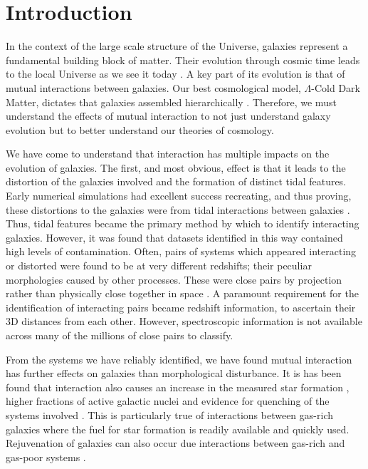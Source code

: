 \chapter{Introduction}\label{chapter:introduction}
In the context of the large scale structure of the Universe, galaxies represent a fundamental building block of matter. Their evolution through cosmic time leads to the local Universe as we see it today \citep{2005Natur.435..629S}. A key part of its evolution is that of mutual interactions between galaxies. Our best cosmological model, $\Lambda$-Cold Dark Matter, dictates that galaxies assembled hierarchically \citep{1978MNRAS.183..341W, 1991ApJ...379...52W}. Therefore, we must understand the effects of mutual interaction to not just understand galaxy evolution but to better understand our theories of cosmology.

We have come to understand that interaction has multiple impacts on the evolution of galaxies. The first, and most obvious, effect is that it leads to the distortion of the galaxies involved and the formation of distinct tidal features. Early numerical simulations had excellent success recreating, and thus proving, these distortions to the galaxies were from tidal interactions between galaxies \citep{1972ApJ...178..623T}. Thus, tidal features became the primary method by which to identify interacting galaxies.  However, it was found that datasets identified in this way contained high levels of contamination. Often, pairs of systems which appeared interacting or distorted were found to be at very different redshifts; their peculiar morphologies caused by other processes. These were close pairs by projection rather than physically close together in space \citep[e.g][]{2018MNRAS.479..415A, 2020MNRAS.492.2075B, 2022A&A...661A..52P}. A paramount requirement for the identification of interacting pairs became redshift information, to ascertain their 3D distances from each other. However, spectroscopic information is not available across many of the millions of close pairs to classify.

From the systems we have reliably identified, we have found mutual interaction has further effects on galaxies than morphological disturbance. It is has been found that interaction also causes an increase in the measured star formation \citep{1987ApJ...320...49B, 1992ApJ...400..153M}, higher fractions of active galactic nuclei \citep{2008AJ....135.1877E, 2014MNRAS.441.1297S} and evidence for quenching of the systems involved \citep{1992AJ....104.1039S, 2010MNRAS.407..749G}. This is particularly true of interactions between gas-rich galaxies where the fuel for star formation is readily available and quickly used. Rejuvenation of galaxies can also occur due interactions between gas-rich and gas-poor systems \citep{1992AJ....104.1039S, 2009ApJ...691.1168H}.

